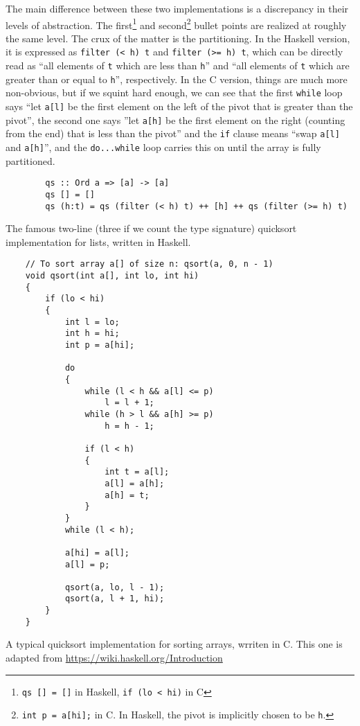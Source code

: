 \documentclass[declaration,mgr,english,shortabstract]{iithesis}
\newcommand{\m}[1]{\texttt{#1}}
\begin{document}
The main difference between these two implementations is a discrepancy in their levels of abstraction. The first\footnote{\m{qs\ []\ =\ []} in Haskell, \m{if\ (lo\ <\ hi)} in C} and second\footnote{\m{int\ p\ =\ a[hi];} in C. In Haskell, the pivot is implicitly chosen to be \m{h}.} bullet points are realized at roughly the same level. The crux of the matter is the partitioning. In the Haskell version, it is expressed as \m{filter (< h) t} and \m{filter (>= h) t}, which can be directly read as ``all elements of \m{t} which are less than \m{h}'' and ``all elements of \m{t} which are greater than or equal to \m{h}'', respectively. In the C version, things are much more non-obvious, but if we squint hard enough, we can see that the first \m{while} loop says ``let \m{a[l]} be the first element on the left of the pivot that is greater than the pivot'', the second one says ''let \m{a[h]} be the first element on the right (counting from the end) that is less than the pivot'' and the \m{if} clause means ``swap \m{a[l]} and \m{a[h]}'', and the \m{do...while} loop carries this on until the array is fully partitioned.

\begin{listing}[H]
    \begin{verbatim}
        qs :: Ord a => [a] -> [a]
        qs [] = []
        qs (h:t) = qs (filter (< h) t) ++ [h] ++ qs (filter (>= h) t)
    \end{verbatim}
    \caption{The famous two-line (three if we count the type signature) quicksort implementation for lists, written in Haskell.}
    \label{HaskellQuicksort}
\end{listing}

\begin{listing}[H]
    \begin{verbatim}
    // To sort array a[] of size n: qsort(a, 0, n - 1)
    void qsort(int a[], int lo, int hi) 
    {
        if (lo < hi)
        {
            int l = lo;
            int h = hi;
            int p = a[hi];

            do
            {
                while (l < h && a[l] <= p) 
                    l = l + 1;
                while (h > l && a[h] >= p)
                    h = h - 1;
                
                if (l < h)
                {
                    int t = a[l];
                    a[l] = a[h];
                    a[h] = t;
                }
            }
            while (l < h);

            a[hi] = a[l];
            a[l] = p;

            qsort(a, lo, l - 1);
            qsort(a, l + 1, hi);
        }
    }
    \end{verbatim}
    \caption{A typical quicksort implementation for sorting arrays, wrriten in C. This one is adapted from \url{https://wiki.haskell.org/Introduction}}
    \label{CQuicksort}
\end{listing}
\end{document}
